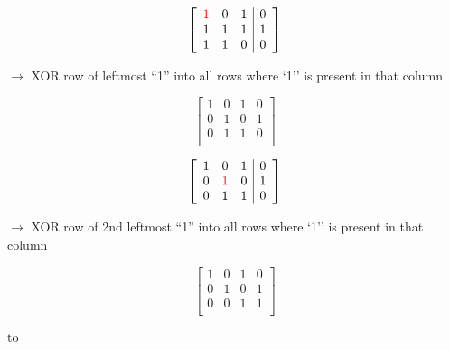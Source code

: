 \documentclass[aspectratio=196]{slides}
\def\TITLE#1{\hbox to \linewidth{\large #1\hfill}}
\def\BOTTOM{\vfill\newpage}
\def\SLIDE#1{\BOTTOM\TITLE{#1}}
\begin{document}
\begin{minipage}{0.2\linewidth}
\[
\left[
\begin{array}{lll|l}
\color{red}{1} &            0 &           1 & 0\\
1 &            1 &           1 & 1\\
1 &            1 &           0 & 0\\
\end{array}
\right]
\]
\end{minipage}
\begin{minipage}{0.4\linewidth}
$\rightarrow$ XOR row of leftmost ``1'' into all rows where `1'' is present in that column
\end{minipage}
\begin{minipage}{0.2\linewidth}
\[
\left[
\begin{array}{lll|l}
1 &            0 &           1 & 0\\
0 &            1 &           0 & 1\\
0 &            1 &           1 & 0\\
\end{array}
\right]
\]
\end{minipage}

\begin{minipage}{0.2\linewidth}
\[
\left[
\begin{array}{lll|l}
1 &            0 &           1 & 0\\
0 &            \color{red}{1} &           0 & 1\\
0 &            1 &           1 & 0\\
\end{array}
\right]
\]
\end{minipage}
\begin{minipage}{0.4\linewidth}
$\rightarrow$ XOR row of 2nd  leftmost ``1'' into all rows where `1'' is present in that column
\end{minipage}
\begin{minipage}{0.2\linewidth}
\[
\left[
\begin{array}{lll|l}
1 &            0 &           1 & 0\\
0 &            1 &           0 & 1\\
0 &            0 &           1 & 1\\
\end{array}
\right]
\]
\end{minipage}


\vfill
\newpage
\SLIDE{Gaussian Elimination cont.}
\end{document}
